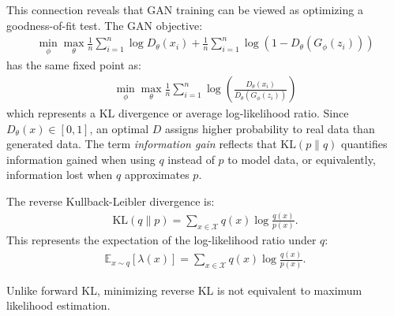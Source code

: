 This connection reveals that GAN training can be viewed as optimizing a goodness-of-fit test. The GAN objective:
\begin{align}
	\min_{\phi}\max_{\theta}\frac{1}{n} \sum_{i=1}^n \log{D_\theta(x_i)} + \frac{1}{n} \sum_{i=1}^n\log{(1 - D_\theta(G_\phi(z_i)))}
\end{align}
has the same fixed point as:
\begin{align}
	\min_{\phi}\max_{\theta}\frac{1}{n} \sum_{i=1}^n \log{\left(\frac{D_\theta(x_i)}{D_\theta(G_\phi(z_i))}\right)}
\end{align}
which represents a KL divergence or average log-likelihood ratio. Since $D_\theta(x) \in [0, 1]$, an optimal $D$ assigns higher probability to real data than generated data.
The term \textit{information gain} reflects that $\text{KL}(p \| q)$ quantifies information gained when using $q$ instead of $p$ to model data, or equivalently, information lost when $q$ approximates $p$.
\begin{definition}
	The \textnormal{\sffamily reverse Kullback-Leibler divergence} is:
	\begin{align}
		\label{eq:reverse-KL}
		\text{KL}(q \| p) = \sum_{x \in \mathcal{X}} q(x) \log\frac{q(x)}{p(x)}.
	\end{align}
	This represents the expectation of the log-likelihood ratio under $q$:
	\begin{align}
		\mathbb{E}_{x \sim q}[\lambda(x)] = \sum_{x \in \mathcal{X}} q(x)\log \frac{q(x)}{p(x)}.
	\end{align}
\end{definition}
Unlike forward KL, minimizing reverse KL is not equivalent to maximum likelihood estimation.
